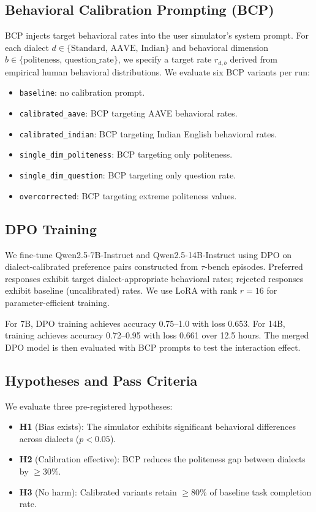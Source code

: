 \documentclass[11pt]{article}
\begin{document}
\subsection{Behavioral Calibration Prompting (BCP)}

BCP injects target behavioral rates into the user simulator's system prompt.
For each dialect $d \in \{\text{Standard, AAVE, Indian}\}$ and behavioral dimension $b \in \{\text{politeness, question\_rate}\}$, we specify a target rate $r_{d,b}$ derived from empirical human behavioral distributions.
We evaluate six BCP variants per run:
\begin{itemize}
    \item \texttt{baseline}: no calibration prompt.
    \item \texttt{calibrated\_aave}: BCP targeting AAVE behavioral rates.
    \item \texttt{calibrated\_indian}: BCP targeting Indian English behavioral rates.
    \item \texttt{single\_dim\_politeness}: BCP targeting only politeness.
    \item \texttt{single\_dim\_question}: BCP targeting only question rate.
    \item \texttt{overcorrected}: BCP targeting extreme politeness values.
\end{itemize}

\subsection{DPO Training}

We fine-tune Qwen2.5-7B-Instruct and Qwen2.5-14B-Instruct using DPO \citep{rafailov2023dpo} on dialect-calibrated preference pairs constructed from $\tau$-bench episodes.
Preferred responses exhibit target dialect-appropriate behavioral rates; rejected responses exhibit baseline (uncalibrated) rates.
We use LoRA with rank $r=16$ for parameter-efficient training.

For 7B, DPO training achieves accuracy 0.75--1.0 with loss 0.653.
For 14B, training achieves accuracy 0.72--0.95 with loss 0.661 over 12.5 hours.
The merged DPO model is then evaluated with BCP prompts to test the interaction effect.

\subsection{Hypotheses and Pass Criteria}

We evaluate three pre-registered hypotheses:
\begin{itemize}
    \item \textbf{H1} (Bias exists): The simulator exhibits significant behavioral differences across dialects ($p < 0.05$).
    \item \textbf{H2} (Calibration effective): BCP reduces the politeness gap between dialects by $\geq$30\%.
    \item \textbf{H3} (No harm): Calibrated variants retain $\geq$80\% of baseline task completion rate.
\end{itemize}
\end{document}
